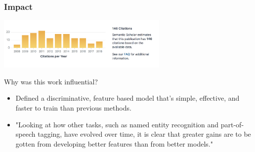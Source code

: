 \documentclass{beamer}
\begin{document}
\begin{frame}
  \frametitle{Impact}
  \includegraphics[height=1in]{citations.png}
  \begin{block}{Why was this work influential?}
    \begin{itemize}
      \item Defined a discriminative, feature based model that's simple, effective, and faster to
            train than previous methods.
      \item "Looking at how other tasks, such as named
            entity recognition and part-of-speech tagging, have
            evolved over time, it is clear that greater gains are to
            be gotten from developing better features than from
            better models."
            
    \end{itemize}
  \end{block}
\end{frame}

\begin{frame}
\end{frame}
\end{document}
